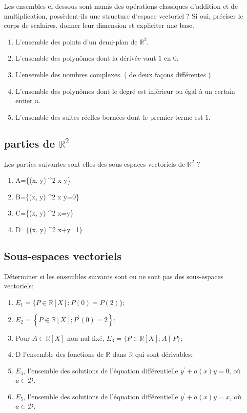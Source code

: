   Les ensembles ci dessous sont munis des opérations classiques d'addition et de multiplication, possèdent-ils une structure d'espace vectoriel ? \newline 
  Si oui, préciser le corps de scalaires, donner leur dimension et expliciter une base.
  
  \begin{enumerate}[i]
      \item L'ensemble des points d'un demi-plan de \(\mathbb{R}^2\).
      \item L'ensemble des polynômes dont la dérivée vaut $1$ en $0$.
      \item L'ensemble des nombres complexes. ( de deux façons différentes )
      \item L'ensemble des polynômes dont le degré est inférieur ou égal à un certain entier $n$.
      \item L'ensemble des suites réelles bornées dont le premier terme est $1$.
  \end{enumerate}
  
  \subsection{parties de $\mathbb{R}^2$}

    Les parties suivantes sont-elles des sous-espaces vectoriels de $\mathbb{R}^2$ ?
    \begin{enumerate}[i]
      \item A=\left\{(x, y) \in {}^2 \mid x \leqslant y\right\} \\
      \item B=\left\{(x, y) \in {}^2 \mid x y=0\right\} \\
      \item C=\left\{(x, y) \in {}^2 \mid x=y\right\} \\
      \item D=\left\{(x, y) \in {}^2 \mid x+y=1\right\}
    \end{enumerate}
    
    \subsection{Sous-espaces vectoriels}
    Déterminer si les ensembles suivants sont ou ne sont pas des sous-espaces vectoriels:
    \begin{enumerate}[i]
      \item $E_1=\{P \in \mathbb{R}[X] ; P(0)=P(2)\}$;
      \item $E_2=\left\{P \in \mathbb{R}[X] ; P^{\prime}(0)=2\right\}$;
      \item Pour $A \in \mathbb{R}[X]$ non-nul fixé, $E_3=\{P \in \mathbb{R}[X] ; A \mid P\}$;
      \item D l'ensemble des fonctions de $\mathbb{R}$ dans $\mathbb{R}$ qui sont dérivables;
      \item $E_4$, l'ensemble des solutions de l'équation différentielle $y^{\prime}+a(x) y=0$, où $a \in \mathcal{D}$.
      \item $E_5$, l'ensemble des solutions de l'équation différentielle $y^{\prime}+a(x) y=x$, où $a \in \mathcal{D}$.
    \end{enumerate}


